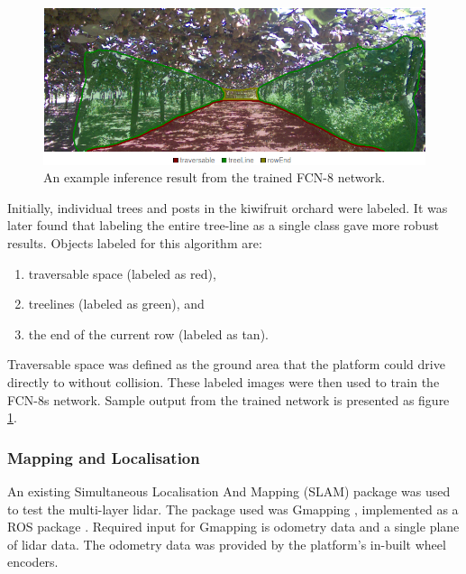 \documentclass[preprint,authoryear,12pt]{elsarticle}
\begin{document}
        \begin{figure}[htb]
            \centering
            \includegraphics[width=\linewidth]{imgs/photos/semSegRowResults.png}
            \caption{
                An example inference result from the trained FCN-8 network.
            }
            \label{fig:semSegRowResults}
        \end{figure}

        Initially, individual trees and posts in the kiwifruit orchard were labeled.
    	It was later found that labeling the entire tree-line as a single class gave more robust results.
    	Objects labeled for this algorithm are:
        \begin{enumerate}
        \item traversable space (labeled as red),
        \item treelines (labeled as green), and
        \item the end of the current row (labeled as tan).
        \end{enumerate}
        Traversable space was defined as the ground area that the platform could drive directly to without collision.
        These labeled images were then used to train the FCN-8s network.
    	Sample output from the trained network is presented as figure \ref{fig:semSegRowResults}.

    \subsubsection{Mapping and Localisation}
        An existing Simultaneous Localisation And Mapping (SLAM) package was used to test the multi-layer lidar.
        The package used was Gmapping \citep{Grisetti2007}, implemented as a ROS package \citep{Gerkey2010}.
    	Required input for Gmapping is odometry data and a single plane of lidar data.
        The odometry data was provided by the platform's in-built wheel encoders.
\end{document}
